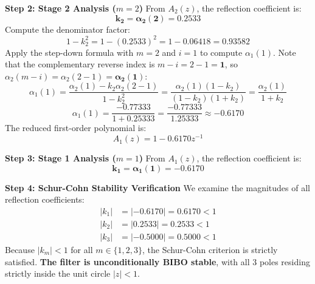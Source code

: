 \documentclass[11pt,a4paper]{article}
\begin{document}
\vspace{1mm}
\noindent\textbf{Step 2: Stage 2 Analysis ($m = 2$)}
From $A_2(z)$, the reflection coefficient is:
\begin{equation}
\mathbf{k_2 = \alpha_2(2) = 0.2533}
\end{equation}
Compute the denominator factor:
\begin{equation}
1 - k_2^2 = 1 - (0.2533)^2 = 1 - 0.06418 = 0.93582
\end{equation}
Apply the step-down formula with $m = 2$ and $i = 1$ to compute $\alpha_1(1)$. Note that the complementary reverse index is $m - i = 2 - 1 = \mathbf{1}$, so $\alpha_2(m-i) = \alpha_2(2-1) = \mathbf{\alpha_2(1)}$:
\begin{equation}
\alpha_1(1) = \frac{\alpha_2(1) - k_2 \alpha_2(2-1)}{1 - k_2^2} = \frac{\alpha_2(1)(1 - k_2)}{(1 - k_2)(1 + k_2)} = \frac{\alpha_2(1)}{1 + k_2}
\end{equation}
\begin{equation}
\alpha_1(1) = \frac{-0.77333}{1 + 0.25333} = \frac{-0.77333}{1.25333} \approx \mathbf{-0.6170}
\end{equation}
The reduced first-order polynomial is:
\begin{equation}
A_1(z) = 1 - 0.6170 z^{-1}
\end{equation}

\vspace{1mm}
\noindent\textbf{Step 3: Stage 1 Analysis ($m = 1$)}
From $A_1(z)$, the reflection coefficient is:
\begin{equation}
\mathbf{k_1 = \alpha_1(1) = -0.6170}
\end{equation}

\vspace{1mm}
\noindent\textbf{Step 4: Schur-Cohn Stability Verification}
We examine the magnitudes of all reflection coefficients:
\begin{align}
|k_1| &= |-0.6170| = 0.6170 < 1 \\
|k_2| &= |0.2533| = 0.2533 < 1 \\
|k_3| &= |-0.5000| = 0.5000 < 1
\end{align}
Because $|k_m| < 1$ for all $m \in \{1, 2, 3\}$, the Schur-Cohn criterion is strictly satisfied. \textbf{The filter is unconditionally BIBO stable}, with all 3 poles residing strictly inside the unit circle $|z| < 1$.
\end{document}
